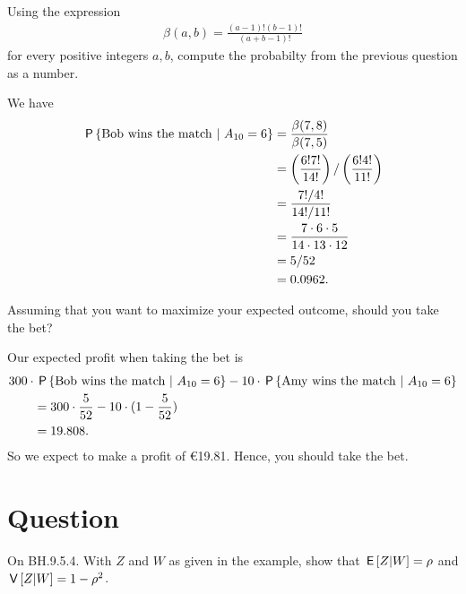 \begin{exercise}
Using the expression
\begin{align}
    \beta(a,b) = \frac{(a-1)!(b-1)!}{(a+b-1)!}
\end{align}
for every positive integers $a,b$, compute the probabilty from the previous question as a number.
\begin{solution}
We have
\begin{align}
    \P{ \text{Bob wins the match} \ | \ A_{10} = 6 } &= \frac{\beta(7,8)}{\beta(7,5)} \\
    &= \left(\frac{6!7!}{14!}\right)/\left(\frac{6!4!}{11!}\right) \\
    &= \frac{7!/4!}{14!/11!} \\
    &= \frac{7\cdot 6 \cdot 5}{14 \cdot 13 \cdot 12} \\
    &= 5/52 \\
    &= 0.0962.
\end{align}
\end{solution}
\end{exercise}

\begin{exercise}
Assuming that you want to maximize your expected outcome, should you take the bet?
\begin{solution}
Our expected profit when taking the bet is
\begin{align}
    &300 \cdot \P{ \text{Bob wins the match} \ | \ A_{10} = 6 } - 10 \cdot \P{ \text{Amy wins the match} \ | \ A_{10} = 6 } \\
    &\qquad= 300 \cdot \frac{5}{52} - 10 \cdot (1 - \frac{5}{52}) \\
    &\qquad= 19.808.
\end{align}
So we expect to make a profit of €19.81. Hence, you should take the bet.
\end{solution}
\end{exercise}


\section*{Question}

\begin{exercise}
On BH.9.5.4. With $Z$ and $W$ as given in the example, show that $\E{Z|W} = \rho$ and $\V{Z|W} = 1-\rho^{2}$.
\begin{hint}
\end{hint}
\begin{solution}
\end{solution}
\end{exercise}

